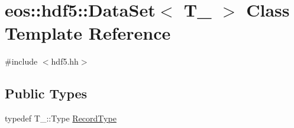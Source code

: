 \hypertarget{classeos_1_1hdf5_1_1DataSet}{
\section{eos::hdf5::DataSet$<$ T\_\- $>$ Class Template Reference}
\label{classeos_1_1hdf5_1_1DataSet}
}


{\ttfamily \#include $<$hdf5.hh$>$}\subsection*{Public Types}
\begin{DoxyCompactItemize}
\item 
typedef T\_\-::Type \hyperlink{classeos_1_1hdf5_1_1DataSet_a010bb09725c4d84df2db7f60e0a88a1f}{RecordType}
\end{DoxyCompactItemize}
